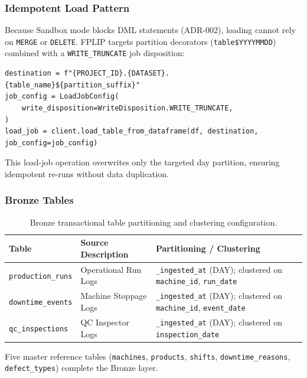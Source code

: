 \documentclass[12pt, a4paper]{report}
\begin{document}
\subsubsection{Idempotent Load Pattern}
Because Sandbox mode blocks DML statements (ADR-002), loading cannot rely on \texttt{MERGE} or \texttt{DELETE}. FPLIP targets partition decorators (\texttt{table\$YYYYMMDD}) combined with a \texttt{WRITE\_TRUNCATE} job disposition:

\begin{lstlisting}[style=pythonstyle, caption={Idempotent Bronze partition decorator load}, label={lst:bronze-load}]
destination = f"{PROJECT_ID}.{DATASET}.{table_name}${partition_suffix}"
job_config = LoadJobConfig(
    write_disposition=WriteDisposition.WRITE_TRUNCATE,
)
load_job = client.load_table_from_dataframe(df, destination, job_config=job_config)
\end{lstlisting}

This load-job operation overwrites only the targeted day partition, ensuring idempotent re-runs without data duplication.

\subsubsection{Bronze Tables}
\begin{table}[h]
\centering
\begin{tabularx}{\textwidth}{l X l}
\toprule
\textbf{\color{primary}Table} & \textbf{\color{primary}Source Description} & \textbf{\color{primary}Partitioning / Clustering} \\
\midrule
\texttt{production\_runs} & Operational Run Logs & \texttt{\_ingested\_at} (DAY); clustered on \texttt{machine\_id}, \texttt{run\_date} \\
\texttt{downtime\_events} & Machine Stoppage Logs & \texttt{\_ingested\_at} (DAY); clustered on \texttt{machine\_id}, \texttt{event\_date} \\
\texttt{qc\_inspections} & QC Inspector Logs & \texttt{\_ingested\_at} (DAY); clustered on \texttt{inspection\_date} \\
\bottomrule
\end{tabularx}
\caption{Bronze transactional table partitioning and clustering configuration.}
\label{tab:bronze-tables}
\end{table}

Five master reference tables (\texttt{machines}, \texttt{products}, \texttt{shifts}, \texttt{downtime\_reasons}, \texttt{defect\_types}) complete the Bronze layer.
\end{document}
